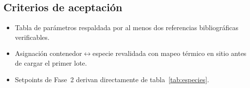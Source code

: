 \subsection{Criterios de aceptación}
\label{sec:especies:aceptacion}

\begin{itemize}[leftmargin=*,itemsep=0pt]
  \item Tabla de parámetros respaldada por al menos dos referencias
        bibliográficas verificables.
  \item Asignación contenedor$\leftrightarrow$especie revalidada con
        mapeo térmico en sitio antes de cargar el primer lote.
  \item Setpoints de Fase~2 derivan directamente de
        tabla~\ref{tab:especies}.
\end{itemize}
